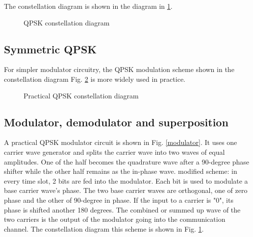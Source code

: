 \documentclass{book}
\begin{document}
The constellation diagram is shown in the diagram in \ref{QPSK}.

\begin{figure}[ht]
\caption{QPSK constellation diagram}
\label{QPSK}
\end{figure}

\subsection{Symmetric QPSK}
For simpler modulator circuitry, the QPSK modulation scheme shown in the constellation diagram Fig. \ref{sQPSK} is more widely used in practice.
\begin{figure}[hb]
\caption{Practical QPSK constellation diagram}
\label{sQPSK}
\end{figure}

\subsection{Modulator, demodulator and superposition}
A practical QPSK modulator circuit is shown in Fig. \ref{modulator}. It uses one carrier wave generator and splits the carrier wave into two waves of equal amplitudes. One of the half becomes the quadrature wave after a 90-degree phase shifter while the other half remains as the in-phase wave. modified scheme: in every time slot, 2 bits are fed into the modulator. Each bit is used to modulate a base carrier wave's phase. The two base carrier waves are orthogonal, one of zero phase and the other of 90-degree in phase. If the input to a carrier is "0", its phase is shifted another 180 degrees. The combined or summed up wave of the two carriers is the output of the modulator going into the communication channel. The constellation diagram this scheme is shown in Fig. \ref{QPSK}.
\end{document}
